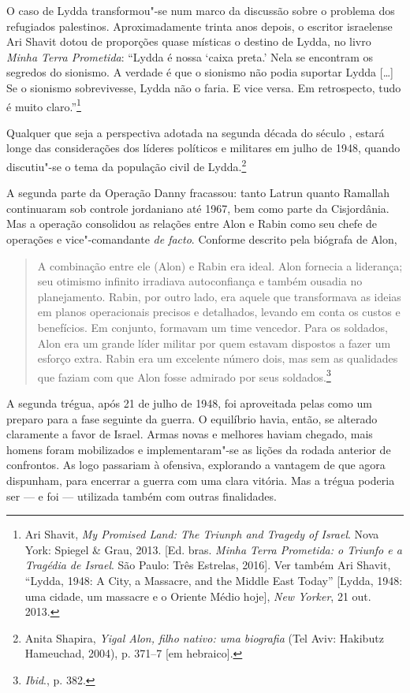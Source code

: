 O caso de Lydda transformou"-se num marco da discussão sobre o problema
dos refugiados palestinos. Aproximadamente trinta anos depois, o escritor
israelense Ari Shavit dotou de proporções quase místicas o destino de
	Lydda, no livro \emph{Minha Terra Prometida}: ``Lydda é nossa `caixa
	preta.' Nela se encontram os segredos do sionismo. A verdade é que o
	sionismo não podia suportar Lydda {[}\ldots{}{]} Se o sionismo sobrevivesse, Lydda
não o faria. E vice versa. Em retrospecto, tudo é muito
claro.''\footnote{Ari Shavit, \emph{My Promised Land: The Triunph and Tragedy of Israel}. Nova York: Spiegel \& Grau, 2013. {[}Ed. bras. \emph{Minha Terra Prometida: o Triunfo e a Tragédia de Israel}. São Paulo: Três Estrelas, 2016{]}. Ver também Ari Shavit, ``Lydda, 1948: A City,
a Massacre, and the Middle East Today'' [Lydda, 1948: uma cidade, um massacre e o Oriente Médio hoje],
\emph{New Yorker}, 21 out. 2013.}

Qualquer que seja a perspectiva adotada na segunda década do século ,
estará longe das considerações dos líderes políticos e militares em
julho de 1948, quando discutiu"-se o tema da população civil de
Lydda.\footnote{Anita Shapira, \emph{Yigal Alon, filho nativo: uma biografia} (Tel Aviv:
Hakibutz Hameuchad, 2004), p. 371--7 {[}em hebraico{]}.}

A segunda parte da Operação Danny fracassou: tanto Latrun quanto
Ramallah continuaram sob controle jordaniano até 1967, bem como parte da Cisjordânia.
Mas a operação consolidou as relações entre Alon e Rabin como
seu chefe de operações e vice"-comandante \emph{de facto}. Conforme
descrito pela biógrafa de Alon, 

\begin{quote}
A combinação entre ele (Alon) e Rabin
era ideal. Alon fornecia a liderança; seu otimismo infinito irradiava 
autoconfiança e também ousadia no planejamento. Rabin,
por outro lado, era aquele que transformava as ideias em planos
operacionais precisos e detalhados, levando em conta os custos e
benefícios. Em conjunto, formavam um time vencedor. Para os soldados, Alon
era um grande líder militar por quem estavam dispostos a fazer um
esforço extra. Rabin era um excelente número dois, mas sem as qualidades
que faziam com que Alon fosse admirado por seus soldados.\footnote{\emph{Ibid}., p. 382.}
\end{quote}

A segunda trégua, após 21 de julho de 1948, foi aproveitada pelas 
como um preparo para a fase seguinte da guerra. O equilíbrio havia,
então, se alterado claramente a favor de Israel. Armas novas e melhores
haviam chegado, mais homens foram mobilizados e 
implementaram"-se as lições da rodada anterior de confrontos. As  logo
passariam à ofensiva, explorando a vantagem de que agora dispunham, para
encerrar a guerra com uma clara vitória. Mas a trégua poderia ser --- e foi ---
utilizada também com outras finalidades.

